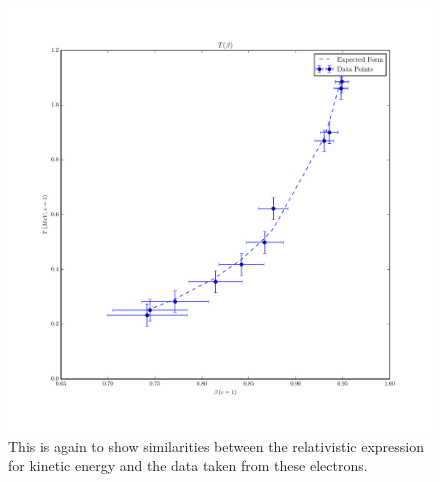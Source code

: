 \documentclass[reprint, nobibnotes, amssymb, amsmath, amsfonts, physics, mathtools, mathrsfs, floatfix]{revtex4-1}
\begin{document}
\begin{widetext}
      \begin{figure}[h]
        \centering
        \includegraphics[width=\linewidth]{../plots/energyvsspeed.pdf}
        \caption{This is again to show similarities between the relativistic expression for kinetic energy and the data taken from these electrons. \label{fig:energyvsspeed}}
      \end{figure}


\end{widetext}
\end{document}
